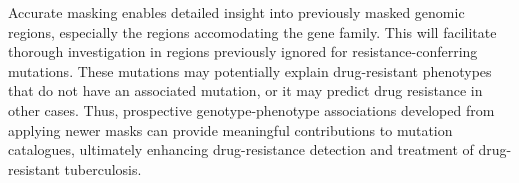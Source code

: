 Accurate masking enables detailed insight into previously masked genomic regions, especially the regions accomodating the \ppe gene family. This will facilitate thorough investigation in regions previously ignored for resistance-conferring mutations. These mutations may potentially explain drug-resistant phenotypes that do not have an associated mutation, or it may predict drug resistance in other cases. Thus, prospective genotype-phenotype associations developed from applying newer masks can provide meaningful contributions to mutation catalogues, ultimately enhancing drug-resistance detection and treatment of drug-resistant tuberculosis.  







